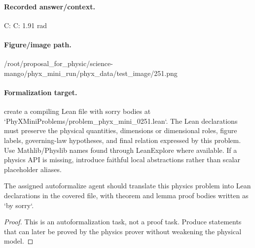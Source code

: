 \paragraph{Recorded answer/context.}
C: C: 1.91 rad

\paragraph{Figure/image path.}
/root/proposal\_for\_physic/science-mango/phyx\_mini\_run/phyx\_data/test\_image/251.png

\paragraph{Formalization target.}
create a compiling Lean file with sorry bodies at `PhyXMiniProblems/problem\_phyx\_mini\_0251.lean`. The Lean declarations must preserve the physical quantities, dimensions or dimensional roles, figure labels, governing-law hypotheses, and final relation expressed by this problem.
Use Mathlib/Physlib names found through LeanExplore where available. If a physics API is missing, introduce faithful local abstractions rather than scalar placeholder aliases.

\begin{theorem}
\label{thm:physics:phyx_mini_0251:target}
The assigned autoformalize agent should translate this physics problem into Lean declarations in the covered file, with theorem and lemma proof bodies written as `by sorry`.
\end{theorem}
\begin{proof}
This is an autoformalization task, not a proof task. Produce statements that can later be proved by the physics prover without weakening the physical model.
\end{proof}


